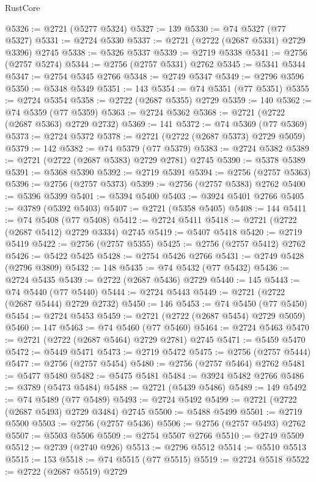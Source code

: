 \begin{lexlean}{RustCore}
\begin{coremodule}
@5326 := @2721 (@5277 @5324)
@5327 := 139
@5330 := @74 @5327 (@77 @5327)
@5331 := @2724 @5330
@5337 := @2721 (@2722 (@2687 @5331) @2729 @3396) @2745
@5338 := @5326 @5337
@5339 := @2719 @5338
@5341 := @2756 (@2757 @5274)
@5344 := @2756 (@2757 @5331) @2762
@5345 := @5341 @5344
@5347 := @2754 @5345 @2766
@5348 := @2749 @5347
@5349 := @2796 @3596
@5350 := @5348 @5349
@5351 := 143
@5354 := @74 @5351 (@77 @5351)
@5355 := @2724 @5354
@5358 := @2722 (@2687 @5355) @2729
@5359 := 140
@5362 := @74 @5359 (@77 @5359)
@5363 := @2724 @5362
@5368 := @2721 (@2722 (@2687 @5363) @2729 @2732)
@5369 := 141
@5372 := @74 @5369 (@77 @5369)
@5373 := @2724 @5372
@5378 := @2721 (@2722 (@2687 @5373) @2729 @5059)
@5379 := 142
@5382 := @74 @5379 (@77 @5379)
@5383 := @2724 @5382
@5389 := @2721 (@2722 (@2687 @5383) @2729 @2781) @2745
@5390 := @5378 @5389
@5391 := @5368 @5390
@5392 := @2719 @5391
@5394 := @2756 (@2757 @5363)
@5396 := @2756 (@2757 @5373)
@5399 := @2756 (@2757 @5383) @2762
@5400 := @5396 @5399
@5401 := @5394 @5400
@5403 := @3924 @5401 @2766
@5405 := @3789 (@5392 @5403)
@5407 := @2721 (@5358 @5405)
@5408 := 144
@5411 := @74 @5408 (@77 @5408)
@5412 := @2724 @5411
@5418 := @2721 (@2722 (@2687 @5412) @2729 @3334) @2745
@5419 := @5407 @5418
@5420 := @2719 @5419
@5422 := @2756 (@2757 @5355)
@5425 := @2756 (@2757 @5412) @2762
@5426 := @5422 @5425
@5428 := @2754 @5426 @2766
@5431 := @2749 @5428 (@2796 @3809)
@5432 := 148
@5435 := @74 @5432 (@77 @5432)
@5436 := @2724 @5435
@5439 := @2722 (@2687 @5436) @2729
@5440 := 145
@5443 := @74 @5440 (@77 @5440)
@5444 := @2724 @5443
@5449 := @2721 (@2722 (@2687 @5444) @2729 @2732)
@5450 := 146
@5453 := @74 @5450 (@77 @5450)
@5454 := @2724 @5453
@5459 := @2721 (@2722 (@2687 @5454) @2729 @5059)
@5460 := 147
@5463 := @74 @5460 (@77 @5460)
@5464 := @2724 @5463
@5470 := @2721 (@2722 (@2687 @5464) @2729 @2781) @2745
@5471 := @5459 @5470
@5472 := @5449 @5471
@5473 := @2719 @5472
@5475 := @2756 (@2757 @5444)
@5477 := @2756 (@2757 @5454)
@5480 := @2756 (@2757 @5464) @2762
@5481 := @5477 @5480
@5482 := @5475 @5481
@5484 := @3924 @5482 @2766
@5486 := @3789 (@5473 @5484)
@5488 := @2721 (@5439 @5486)
@5489 := 149
@5492 := @74 @5489 (@77 @5489)
@5493 := @2724 @5492
@5499 := @2721 (@2722 (@2687 @5493) @2729 @3484) @2745
@5500 := @5488 @5499
@5501 := @2719 @5500
@5503 := @2756 (@2757 @5436)
@5506 := @2756 (@2757 @5493) @2762
@5507 := @5503 @5506
@5509 := @2754 @5507 @2766
@5510 := @2749 @5509
@5512 := @2739 (@2740 @926)
@5513 := @2796 @5512
@5514 := @5510 @5513
@5515 := 153
@5518 := @74 @5515 (@77 @5515)
@5519 := @2724 @5518
@5522 := @2722 (@2687 @5519) @2729

\end{coremodule}
\end{lexlean}
